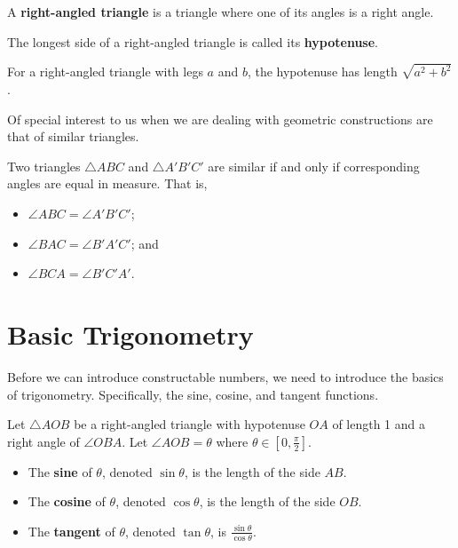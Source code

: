 \begin{definition}
    A \textbf{right-angled triangle} is a triangle where one of its angles is a right angle.
\end{definition}

\begin{definition}
    The longest side of a right-angled triangle is called its \textbf{hypotenuse}.
\end{definition}

\begin{theorem}[Pythagoras]
    For a right-angled triangle with legs $a$ and $b$, the hypotenuse has length $\sqrt{a^2 + b^2}$.
\end{theorem}

Of special interest to us when we are dealing with geometric constructions are that of similar triangles.

\begin{definition}
    Two triangles $\triangle ABC$ and $\triangle A'B'C'$ are similar if and only if corresponding angles are equal in measure. That is,
    \begin{itemize}
        \item $\angle ABC = \angle A'B'C'$;
        \item $\angle BAC = \angle B'A'C'$; and
        \item $\angle BCA = \angle B'C'A'$.
    \end{itemize}
\end{definition}

\section{Basic Trigonometry}
Before we can introduce constructable numbers, we need to introduce the basics of trigonometry. Specifically, the sine, cosine, and tangent functions.

\begin{definition}
    Let $\triangle AOB$ be a right-angled triangle with hypotenuse $OA$ of length 1 and a right angle of $\angle OBA$. Let $\angle AOB = \theta$ where $\theta \in [0, \frac\pi2]$.
    \begin{itemize}
        \item The \textbf{sine} of $\theta$, denoted $\sin\theta$, is the length of the side $AB$.
        \item The \textbf{cosine} of $\theta$, denoted $\cos\theta$, is the length of the side $OB$.
        \item The \textbf{tangent} of $\theta$, denoted $\tan\theta$, is $\frac{\sin\theta}{\cos\theta}$.
    \end{itemize}
\end{definition}

